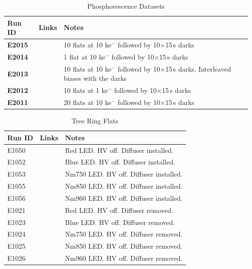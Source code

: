 \begin{table}[ht]\label{table:runs_phosphorescence}
\centering
\caption{Phosphorescence Datasets}
\begin{tabular}{|p{1.5cm}|p{2.9cm}|p{9cm}|}
\hline
Run ID & Links & Notes \\ \hline
\textbf{E2015} & & 10 flats at 10 ke$^-$ followed by 10$\times$15\,s darks \\ \hline
\textbf{E2014} & & 1 flat at 10 ke$^-$ followed by 10$\times$15\,s darks \\ \hline
\textbf{E2013} & & 10 flats at 10 ke$^-$ followed by 10$\times$15\,s darks. Interleaved biases with the darks \\ \hline
\textbf{E2012} & & 10 flats at 1 ke$^-$ followed by 10$\times$15\,s darks \\ \hline
\textbf{E2011} & & 20 flats at 10 ke$^-$ followed by 10$\times$15\,s darks \\ \hline
\end{tabular}
\end{table}

\begin{table}[ht]\label{table:runs_treeRing}
\centering
\caption{Tree Ring Flats}
\begin{tabular}{|p{1.5cm}|p{2.9cm}|p{9cm}|}
\hline
Run ID & Links & Notes \\ \hline
E1050 & & Red LED. HV off. Diffuser installed. \\ \hline
E1052 & & Blue LED. HV off. Diffuser installed. \\ \hline
E1053 & & Nm750 LED. HV off. Diffuser installed. \\ \hline
E1055 & & Nm850 LED. HV off. Diffuser installed. \\ \hline
E1056 & & Nm960 LED. HV off. Diffuser installed. \\ \hline
\hline
E1021 & & Red LED. HV off. Diffuser removed. \\ \hline
E1023 & & Blue LED. HV off. Diffuser removed. \\ \hline
E1024 & & Nm750 LED. HV off. Diffuser removed. \\ \hline
E1025 & & Nm850 LED. HV off. Diffuser removed. \\ \hline
E1026 & & Nm960 LED. HV off. Diffuser removed. \\ \hline
\end{tabular}
\end{table}


